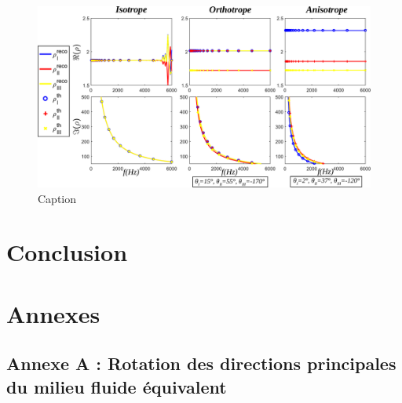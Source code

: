 \documentclass[12pt]{report}
\begin{document}
    \begin{figure}[ht!]
        \centering
        \includegraphics[scale=0.45]{Density_dir.pdf}
        \caption{Caption}
        \label{rho_dir}
    \end{figure}

\chapter*{Conclusion}




\chapter*{Annexes}
\section*{Annexe A : Rotation des directions principales du milieu fluide équivalent}
\label{Ch_Ann_S_rot}
\end{document}
